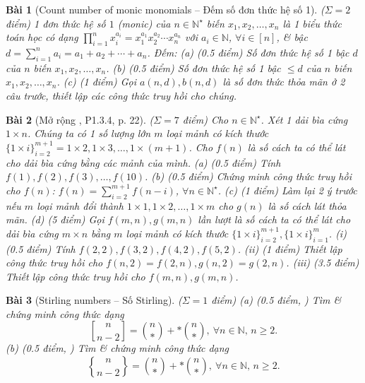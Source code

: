 \documentclass{article}
\newtheorem{baitoan}{Bài}
\newcommand{\genstirlingI}[3]{%
    \genfrac{[}{]}{0pt}{#1}{#2}{#3}%
}
\newcommand{\genstirlingII}[3]{%
    \genfrac{\{}{\}}{0pt}{#1}{#2}{#3}%
}
\newcommand{\stirlingI}[2]{\genstirlingI{}{#1}{#2}}
\newcommand{\stirlingII}[2]{\genstirlingII{}{#1}{#2}}
\begin{document}
\begin{baitoan}[Count number of monic monomials -- Đếm số đơn thức hệ số 1]
    {\rm($\Sigma = 2$ điểm)} 1 đơn thức hệ số $1$ (monic) của $n\in\mathbb{N}^\star$ biến $x_1,x_2,\ldots,x_n$ là 1 biểu thức toán học có dạng $\prod_{i=1}^n x_i^{a_i} = x_1^{a_1}x_2^{a_2}\cdots x_n^{a_n}$ với $a_i\in\mathbb{N}$, $\forall i\in[n]$, \& {\rm bậc} $d = \sum_{i=1}^n a_i = a_1 + a_2 + \cdots + a_n$. Đếm: (a) {\rm(0.5 điểm)} Số đơn thức hệ số 1 bậc $d$ của $n$ biến $x_1,x_2,\ldots,x_n$. (b) {\rm(0.5 điểm)} Số đơn thức hệ số 1 bậc $\le d$ của $n$ biến $x_1,x_2,\ldots,x_n$. (c) {\rm(1 điểm)} Gọi $a(n,d),b(n,d)$ là số đơn thức thỏa mãn ở 2 câu trước, thiết lập các công thức truy hồi cho chúng.
\end{baitoan}


\begin{baitoan}[Mở rộng \cite{Shahriari2022}, P1.3.4, p. 22]
    {\rm($\Sigma = 7$ điểm)} Cho $n\in\mathbb{N}^\star$. Xét 1 dải bìa cứng $1\times n$. Chúng ta có 1 số lượng lớn $m$ loại mảnh có kích thước $\{1\times i\}_{i=2}^{m+1} = 1\times2,1\times3,\ldots,1\times(m + 1)$. Cho $f(n)$ là số cách ta có thể lát cho dải bìa cứng bằng các mảnh của mình. (a) {\rm(0.5 điểm)} Tính $f(1),f(2),f(3),\ldots,f(10)$. (b) {\rm(0.5 điểm)} Chứng minh công thức truy hồi cho $f(n)$: $f(n) = \sum_{i=2}^{m + 1} f(n - i)$, $\forall n\in\mathbb{N}^\star$. (c) {\rm(1 điểm)} Làm lại 2 ý trước nếu $m$ loại mảnh đổi thành $1\times1,1\times2,\ldots,1\times m$ cho $g(n)$ là số cách lát thỏa mãn. (d) {\rm(5 điểm)} Gọi $f(m,n),g(m,n)$ lần lượt là số cách ta có thể lát cho dải bìa cứng $m\times n$ bằng $m$ loại mảnh có kích thước $\{1\times i\}_{i=2}^{m+1},\{1\times i\}_{i=1}^m$. (i) {\rm(0.5 điểm)} Tính $f(2,2),f(3,2),f(4,2),f(5,2)$. (ii) {\rm(1 điểm)} Thiết lập công thức truy hồi cho $f(n,2) = f(2,n),g(n,2) = g(2,n)$. (iii) {\rm(3.5 điểm)} Thiết lập công thức truy hồi cho $f(m,n),g(m,n)$.
\end{baitoan}

\begin{baitoan}[Stirling numbers -- Số Stirling]
    {\rm($\Sigma = 1$ điểm)} (a) {\rm(0.5 điểm, \cite[P6.1.13]{Shahriari2022})} Tìm \& chứng minh công thức dạng
    \begin{equation*}
        \stirlingI{n}{n - 2} = \binom{n}{*} + *\binom{n}{*},\ \forall n\in\mathbb{N},\,n\ge2.
    \end{equation*}
    (b) {\rm(0.5 điểm, \cite[P6.2.7]{Shahriari2022})} Tìm \& chứng minh công thức dạng
    \begin{equation*}
        \stirlingII{n}{n - 2} = \binom{n}{*} + *\binom{n}{*},\ \forall n\in\mathbb{N},\,n\ge2.
    \end{equation*}  
\end{baitoan}
\end{document}
